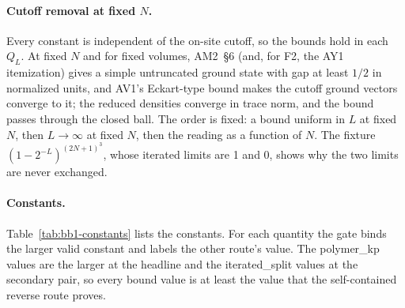 \paragraph{Cutoff removal at fixed $N$.} Every constant is independent of the
on-site cutoff, so the bounds hold in each $Q_L$. At fixed $N$ and for fixed
volumes, AM2~\S6 (and, for F2, the AY1 itemization) gives a simple
untruncated ground state with gap at least $1/2$ in normalized units, and
AV1's Eckart-type bound makes the cutoff ground vectors converge to it; the
reduced densities converge in trace norm, and the bound passes through the
closed ball. The order is fixed: a bound uniform in $L$ at fixed $N$, then
$L\to\infty$ at fixed $N$, then the reading as a function of $N$. The
fixture $(1-2^{-L})^{(2N+1)^3}$, whose iterated limits are 1 and 0, shows why
the two limits are never exchanged.

\paragraph{Constants.} Table~\ref{tab:bb1-constants} lists the constants. For
each quantity the gate binds the larger valid constant and labels the other
route's value. The polymer\_kp values are the larger at the headline and the
iterated\_split values at the secondary pair, so every bound value is at least
the value that the self-contained reverse route proves.

